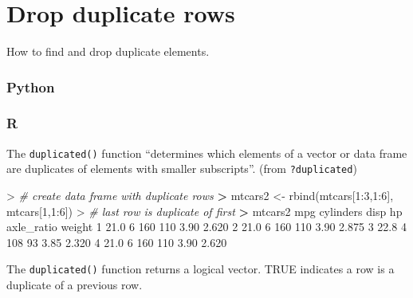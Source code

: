 \documentclass[
]{book}
\newenvironment{Shaded}{\begin{snugshade}}{\end{snugshade}}
\newcommand{\CommentTok}[1]{\textcolor[rgb]{0.56,0.35,0.01}{\textit{#1}}}
\newcommand{\DecValTok}[1]{\textcolor[rgb]{0.00,0.00,0.81}{#1}}
\newcommand{\ErrorTok}[1]{\textcolor[rgb]{0.64,0.00,0.00}{\textbf{#1}}}
\newcommand{\FloatTok}[1]{\textcolor[rgb]{0.00,0.00,0.81}{#1}}
\newcommand{\FunctionTok}[1]{\textcolor[rgb]{0.00,0.00,0.00}{#1}}
\newcommand{\NormalTok}[1]{#1}
\newcommand{\OtherTok}[1]{\textcolor[rgb]{0.56,0.35,0.01}{#1}}
\newcommand{\SpecialCharTok}[1]{\textcolor[rgb]{0.00,0.00,0.00}{#1}}
\begin{document}
\hypertarget{drop-duplicate-rows}{%
\section{Drop duplicate rows}\label{drop-duplicate-rows}}

How to find and drop duplicate elements.

\hypertarget{python-21}{%
\subsubsection*{Python}\label{python-21}}

\hypertarget{r-21}{%
\subsubsection*{R}\label{r-21}}

The \texttt{duplicated()} function ``determines which elements of a vector or data frame are duplicates of elements with smaller subscripts''. (from \texttt{?duplicated})

\begin{Shaded}
\begin{Highlighting}[]
\SpecialCharTok{\textgreater{}} \CommentTok{\# create data frame with duplicate rows}
\ErrorTok{\textgreater{}}\NormalTok{ mtcars2 }\OtherTok{\textless{}{-}} \FunctionTok{rbind}\NormalTok{(mtcars[}\DecValTok{1}\SpecialCharTok{:}\DecValTok{3}\NormalTok{,}\DecValTok{1}\SpecialCharTok{:}\DecValTok{6}\NormalTok{], mtcars[}\DecValTok{1}\NormalTok{,}\DecValTok{1}\SpecialCharTok{:}\DecValTok{6}\NormalTok{])}
\SpecialCharTok{\textgreater{}} \CommentTok{\# last row is duplicate of first}
\ErrorTok{\textgreater{}}\NormalTok{ mtcars2}
\NormalTok{   mpg cylinders disp  hp axle\_ratio weight}
\DecValTok{1} \FloatTok{21.0}         \DecValTok{6}  \DecValTok{160} \DecValTok{110}       \FloatTok{3.90}  \FloatTok{2.620}
\DecValTok{2} \FloatTok{21.0}         \DecValTok{6}  \DecValTok{160} \DecValTok{110}       \FloatTok{3.90}  \FloatTok{2.875}
\DecValTok{3} \FloatTok{22.8}         \DecValTok{4}  \DecValTok{108}  \DecValTok{93}       \FloatTok{3.85}  \FloatTok{2.320}
\DecValTok{4} \FloatTok{21.0}         \DecValTok{6}  \DecValTok{160} \DecValTok{110}       \FloatTok{3.90}  \FloatTok{2.620}
\end{Highlighting}
\end{Shaded}

The \texttt{duplicated()} function returns a logical vector. TRUE indicates a row is a duplicate of a previous row.
\end{document}
